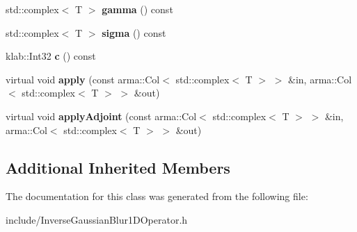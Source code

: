\begin{DoxyCompactItemize}
\item 
std\+::complex$<$ T $>$ {\bfseries gamma} () const \hypertarget{classkl1p_1_1TInverseGaussianBlur1DOperator_3_01std_1_1complex_3_01T_01_4_01_4_a020016de4333fd5323da639b9bf4877c}{}\label{classkl1p_1_1TInverseGaussianBlur1DOperator_3_01std_1_1complex_3_01T_01_4_01_4_a020016de4333fd5323da639b9bf4877c}

\item 
std\+::complex$<$ T $>$ {\bfseries sigma} () const \hypertarget{classkl1p_1_1TInverseGaussianBlur1DOperator_3_01std_1_1complex_3_01T_01_4_01_4_aef79f458e6187c790e11d66e6a63686f}{}\label{classkl1p_1_1TInverseGaussianBlur1DOperator_3_01std_1_1complex_3_01T_01_4_01_4_aef79f458e6187c790e11d66e6a63686f}

\item 
klab\+::\+Int32 {\bfseries c} () const \hypertarget{classkl1p_1_1TInverseGaussianBlur1DOperator_3_01std_1_1complex_3_01T_01_4_01_4_a1d44331354e7a6c934ca2e0df7fa7698}{}\label{classkl1p_1_1TInverseGaussianBlur1DOperator_3_01std_1_1complex_3_01T_01_4_01_4_a1d44331354e7a6c934ca2e0df7fa7698}

\item 
virtual void {\bfseries apply} (const arma\+::\+Col$<$ std\+::complex$<$ T $>$ $>$ \&in, arma\+::\+Col$<$ std\+::complex$<$ T $>$ $>$ \&out)\hypertarget{classkl1p_1_1TInverseGaussianBlur1DOperator_3_01std_1_1complex_3_01T_01_4_01_4_acb5e54bf2c949ba374a6d698a1839fca}{}\label{classkl1p_1_1TInverseGaussianBlur1DOperator_3_01std_1_1complex_3_01T_01_4_01_4_acb5e54bf2c949ba374a6d698a1839fca}

\item 
virtual void {\bfseries apply\+Adjoint} (const arma\+::\+Col$<$ std\+::complex$<$ T $>$ $>$ \&in, arma\+::\+Col$<$ std\+::complex$<$ T $>$ $>$ \&out)\hypertarget{classkl1p_1_1TInverseGaussianBlur1DOperator_3_01std_1_1complex_3_01T_01_4_01_4_ab8350bd705dbde3041d5347a5cb521d5}{}\label{classkl1p_1_1TInverseGaussianBlur1DOperator_3_01std_1_1complex_3_01T_01_4_01_4_ab8350bd705dbde3041d5347a5cb521d5}

\end{DoxyCompactItemize}
\subsection*{Additional Inherited Members}


The documentation for this class was generated from the following file\+:\begin{DoxyCompactItemize}
\item 
include/Inverse\+Gaussian\+Blur1\+D\+Operator.\+h\end{DoxyCompactItemize}
